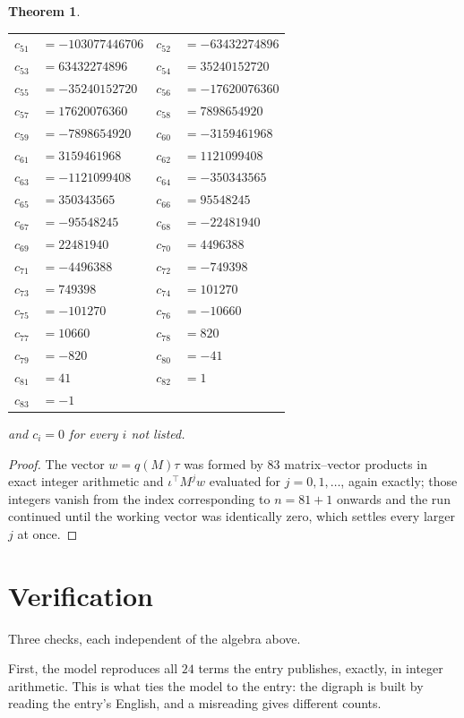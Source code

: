 \documentclass[11pt,a4paper]{article}
\theoremstyle{plain}
\newtheorem{theorem}{Theorem}
\theoremstyle{definition}
\begin{document}
\begin{theorem}
\begin{center}
\begin{tabular}{r@{\,}l@{\qquad}r@{\,}l}
$c_{51}$ & $=-103077446706$ & $c_{52}$ & $=-63432274896$ \\
$c_{53}$ & $=63432274896$ & $c_{54}$ & $=35240152720$ \\
$c_{55}$ & $=-35240152720$ & $c_{56}$ & $=-17620076360$ \\
$c_{57}$ & $=17620076360$ & $c_{58}$ & $=7898654920$ \\
$c_{59}$ & $=-7898654920$ & $c_{60}$ & $=-3159461968$ \\
$c_{61}$ & $=3159461968$ & $c_{62}$ & $=1121099408$ \\
$c_{63}$ & $=-1121099408$ & $c_{64}$ & $=-350343565$ \\
$c_{65}$ & $=350343565$ & $c_{66}$ & $=95548245$ \\
$c_{67}$ & $=-95548245$ & $c_{68}$ & $=-22481940$ \\
$c_{69}$ & $=22481940$ & $c_{70}$ & $=4496388$ \\
$c_{71}$ & $=-4496388$ & $c_{72}$ & $=-749398$ \\
$c_{73}$ & $=749398$ & $c_{74}$ & $=101270$ \\
$c_{75}$ & $=-101270$ & $c_{76}$ & $=-10660$ \\
$c_{77}$ & $=10660$ & $c_{78}$ & $=820$ \\
$c_{79}$ & $=-820$ & $c_{80}$ & $=-41$ \\
$c_{81}$ & $=41$ & $c_{82}$ & $=1$ \\
$c_{83}$ & $=-1$ \\
\end{tabular}
\end{center}
and $c_i=0$ for every $i$ not listed.
\end{theorem}

\begin{proof}
The vector $w=q(M)\tau$ was formed by $83$ matrix--vector products in exact integer
arithmetic and $\iota^{\!\top}M^{j}w$ evaluated for $j=0,1,\dots$, again exactly; those
integers vanish from the index corresponding to $n=81+1$ onwards and the run continued
until the working vector was identically zero, which settles every larger $j$ at once.
\end{proof}

\section{Verification}

Three checks, each independent of the algebra above.

First, the model reproduces all $24$ terms the entry publishes, exactly, in integer
arithmetic. This is what ties the model to the entry: the digraph is built by reading the
entry's English, and a misreading gives different counts.
\end{document}
